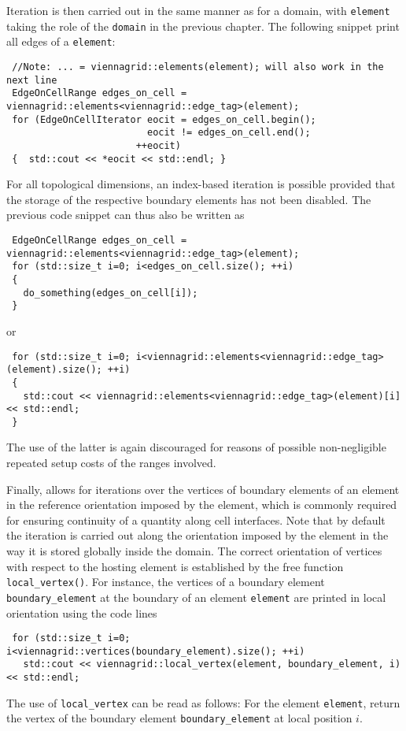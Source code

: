Iteration is then carried out in the same manner as for a domain, with \lstinline|element| taking the role of the \lstinline|domain| in the previous chapter.
The following snippet print all edges of a \lstinline|element|:
\begin{lstlisting}
 //Note: ... = viennagrid::elements(element); will also work in the next line
 EdgeOnCellRange edges_on_cell = viennagrid::elements<viennagrid::edge_tag>(element);
 for (EdgeOnCellIterator eocit = edges_on_cell.begin();
                         eocit != edges_on_cell.end();
                       ++eocit)
 {  std::cout << *eocit << std::endl; } 
\end{lstlisting}

For all topological dimensions, an index-based iteration is possible provided that the storage of the respective boundary elements has not been disabled. The previous code snippet can thus also be written as
\begin{lstlisting}
 EdgeOnCellRange edges_on_cell = viennagrid::elements<viennagrid::edge_tag>(element);
 for (std::size_t i=0; i<edges_on_cell.size(); ++i)
 { 
   do_something(edges_on_cell[i]);
 }
\end{lstlisting}
or
\begin{lstlisting}
 for (std::size_t i=0; i<viennagrid::elements<viennagrid::edge_tag>(element).size(); ++i)
 {
   std::cout << viennagrid::elements<viennagrid::edge_tag>(element)[i] << std::endl;
 }
\end{lstlisting}
The use of the latter is again discouraged for reasons of possible non-negligible repeated setup costs of the ranges involved.


Finally, {\ViennaGrid} allows for iterations over the vertices of boundary elements of an element in the reference orientation imposed by the element, which is commonly required for ensuring continuity of a quantity along cell interfaces. Note that by default the iteration is carried out along the orientation imposed by the element in the way it is stored globally inside the domain.
The correct orientation of vertices with respect to the hosting element is established by the free function \lstinline|local_vertex()|. 
For instance, the vertices of a boundary element \lstinline|boundary_element| at the boundary of an element \lstinline|element| are printed in local orientation using the code lines
\begin{lstlisting}
 for (std::size_t i=0; i<viennagrid::vertices(boundary_element).size(); ++i)
   std::cout << viennagrid::local_vertex(element, boundary_element, i) << std::endl;
\end{lstlisting}
The use of \lstinline|local_vertex| can be read as follows: For the element \lstinline|element|, return the vertex of the boundary element \lstinline|boundary_element| at local position $i$.

